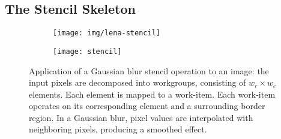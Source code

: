   \subsection{The Stencil Skeleton}

  \begin{figure}
    \centering
    \begin{subfigure}[h]{.55\columnwidth}
      \centering
      \texttt{[image: img/lena-stencil]}
    \end{subfigure}
    \begin{subfigure}[h]{.4\columnwidth}
      \centering
      \texttt{[image: stencil]}
    \end{subfigure}
    \caption{%
    Application of a Gaussian blur stencil operation to an image: the
    input pixels are decomposed into workgroups, consisting of
    $w_r \times w_c$ elements. Each element is mapped to a
    work-item. Each work-item operates on its corresponding element
    and a surrounding border region. In a Gaussian blur, pixel values
    are interpolated with neighboring pixels, producing a smoothed
    effect.%
    }
    \label{fig:stencil-img}
  \end{figure}


